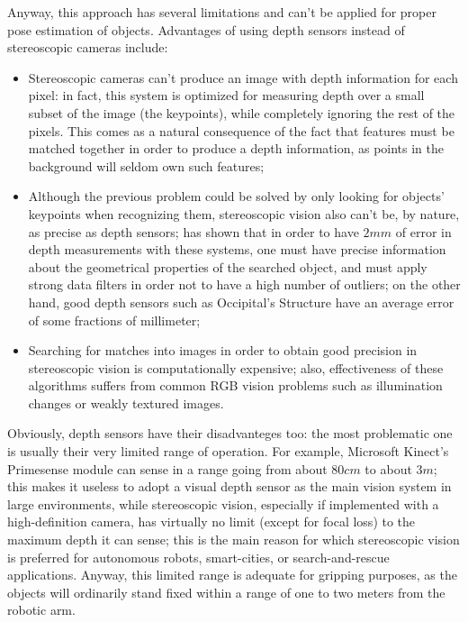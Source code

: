 Anyway, this approach has several limitations and can't be applied for proper
pose estimation of objects. Advantages of using depth sensors instead of
stereoscopic cameras include:
\begin{itemize}
  \item{Stereoscopic cameras can't produce an image with depth information for
      each pixel: in fact, this system is optimized for measuring depth over a
      small subset of the image (the keypoints), while completely ignoring the
      rest of the pixels. This comes as a natural consequence of the fact that
      features must be matched together in order to produce a depth information,
    as points in the background will seldom own such features;}
  \item{Although the previous problem could be solved by only looking for
      objects' keypoints when recognizing them, stereoscopic vision also can't
      be, by nature, as precise as depth sensors; \cite{stereo-precision} has
      shown that in order to have $2\unit{mm}$ of error in depth measurements
      with these systems, one must have precise information about the
      geometrical properties of the searched object, and must apply strong data
      filters in order not to have a high number of outliers; on the other hand,
      good depth sensors such as Occipital's Structure have an average error of
    some fractions of millimeter;}
  \item{Searching for matches into images in order to obtain good precision in
      stereoscopic vision is computationally expensive; also, effectiveness of
      these algorithms suffers from common RGB vision problems such as
    illumination changes or weakly textured images.}
\end{itemize}

Obviously, depth sensors have their disadvanteges too: the most problematic one
is usually their very limited range of operation. For example, Microsoft
Kinect's Primesense module can sense in a range going from about $80\unit{cm}$
to about $3\unit{m}$; this makes it useless to adopt a visual depth sensor as
the main vision system in large environments, while stereoscopic vision,
especially if implemented with a high-definition camera, has
virtually no limit (except for focal loss) to the maximum depth it can sense;
this is the main reason for which stereoscopic vision is preferred for
autonomous robots, smart-cities, or search-and-rescue applications. Anyway, this
limited range is adequate for gripping purposes, as the objects will ordinarily
stand fixed within a range of one to two meters from the robotic arm.


